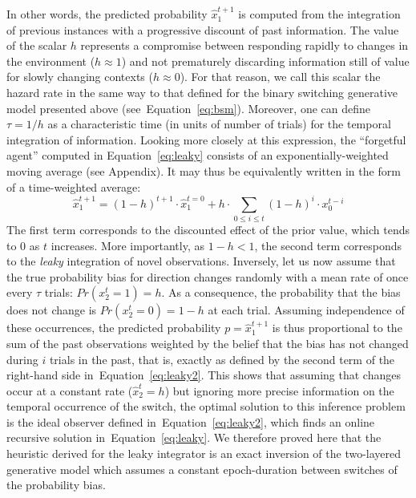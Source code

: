 \documentclass[10pt,letterpaper]{article}
\newcommand{\eql}[1]{\begin{equation}#1\end{equation}}
\newcommand{\seeEq}[1]{Equation~\ref{eq:#1}}
\newcommand{\seeApp}[1]{Appendix}
\begin{document}
In other words, the predicted probability $\hat{x}_1^{t+1}$ is computed
from the integration of previous instances
with a progressive discount of past information.
The value of the scalar $h$ represents
a compromise between responding rapidly
to changes in the environment ($h \approx 1$) and
not prematurely discarding information still of value
for slowly changing contexts  ($h \approx 0$).
For that reason, we call this scalar the hazard rate
in the same way to that defined for the binary switching generative model presented above (see~\seeEq{bsm}).
Moreover, one can define $\tau = 1 / h$ as
a characteristic time (in units of number of trials)
for the temporal integration of information.
Looking more closely at this expression,
the ``forgetful agent'' computed in \seeEq{leaky}
consists of an exponentially-weighted moving average (see \seeApp{leaky}).
It may thus be equivalently written in the form of a time-weighted average:
\eql{
\hat{x}_1^{t+1} = (1-h)^{t+1} \cdot \hat{x}_1^{t=0} + h \cdot \sum_{0\leq i \leq t} (1 - h)^{i} \cdot x_0^{t-i}
\label{eq:leaky2}}
The first term corresponds to the discounted effect of the prior value,
which tends to $0$ as $t$ increases.
More importantly, as $1-h < 1$, the second term corresponds to the \emph{leaky} integration of novel observations.
Inversely, let us now assume that
the true probability bias for direction changes randomly with a mean rate of once
every $\tau$ trials: $Pr(x_2^t=1)=h$.
As a consequence, the probability that the bias does not change is $Pr(x_2^t=0)=1-h$ at each trial.
Assuming independence of these occurrences, the predicted probability $p=\hat{x}_1^{t+1}$ is thus proportional to the sum
of the past observations weighted by the belief that the bias has not changed during $i$ trials in the past, that is, exactly as defined by the second term of the right-hand side in~\seeEq{leaky2}.
This shows that assuming that changes occur at a constant rate ($\hat{x}_2^t=h$)
but ignoring more precise information on the temporal occurrence of the switch,
the optimal solution to this inference problem is the
ideal observer defined in~\seeEq{leaky2},
which finds an online recursive solution in~\seeEq{leaky}.
We therefore proved here that the heuristic derived for the leaky integrator
is an exact inversion of the two-layered generative model
which assumes a constant epoch-duration between switches of the probability bias.
\end{document}
